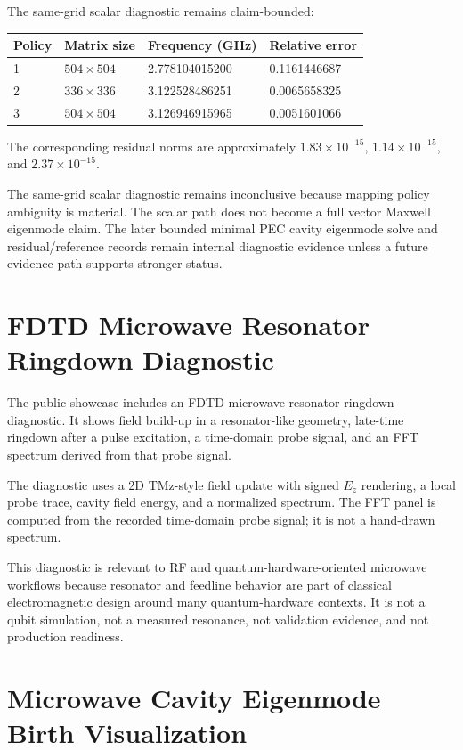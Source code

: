 \documentclass[11pt,a4paper]{article}
\begin{document}
The same-grid scalar diagnostic remains claim-bounded:

\begin{center}
\begin{tabular}{llll}
\toprule
Policy & Matrix size & Frequency (GHz) & Relative error \\
\midrule
1 & $504\times504$ & 2.778104015200 & 0.1161446687 \\
2 & $336\times336$ & 3.122528486251 & 0.0065658325 \\
3 & $504\times504$ & 3.126946915965 & 0.0051601066 \\
\bottomrule
\end{tabular}
\end{center}

The corresponding residual norms are approximately $1.83\times10^{-15}$, $1.14\times10^{-15}$, and $2.37\times10^{-15}$.

The same-grid scalar diagnostic remains inconclusive because mapping policy ambiguity is material. The scalar path does not become a full vector Maxwell eigenmode claim. The later bounded minimal PEC cavity eigenmode solve and residual/reference records remain internal diagnostic evidence unless a future evidence path supports stronger status.

\section{FDTD Microwave Resonator Ringdown Diagnostic}

The public showcase includes an FDTD microwave resonator ringdown diagnostic. It shows field build-up in a resonator-like geometry, late-time ringdown after a pulse excitation, a time-domain probe signal, and an FFT spectrum derived from that probe signal.

The diagnostic uses a 2D TMz-style field update with signed $E_z$ rendering, a local probe trace, cavity field energy, and a normalized spectrum. The FFT panel is computed from the recorded time-domain probe signal; it is not a hand-drawn spectrum.

This diagnostic is relevant to RF and quantum-hardware-oriented microwave workflows because resonator and feedline behavior are part of classical electromagnetic design around many quantum-hardware contexts. It is not a qubit simulation, not a measured resonance, not validation evidence, and not production readiness.

\section{Microwave Cavity Eigenmode Birth Visualization}
\end{document}
